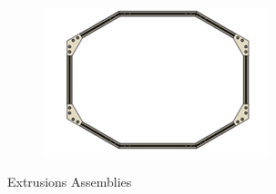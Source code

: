 \documentclass{article}
\begin{document}
\begin{itemize}
\begin{figure}[H]
\begin{subfigure}{.3\textwidth}
          
        \end{subfigure}
        \begin{subfigure}{.3\textwidth}
            \centering
            \includegraphics[width=.9\linewidth]{Images/Chasis/Extrusions3.png}
  
            
          \end{subfigure}
        \caption{Extrusions Assemblies}
        
    \end{figure}


\end{itemize}
\end{document}

